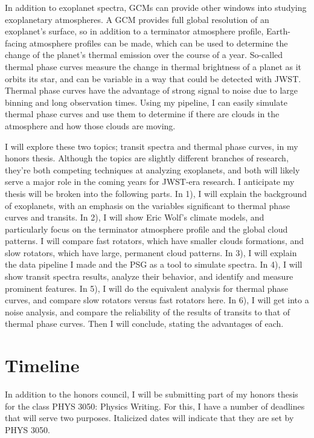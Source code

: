 \documentclass[11pt]{article}
\begin{document}
In addition to exoplanet spectra, GCMs can provide other windows into studying exoplanetary atmospheres. A GCM provides full global resolution of an exoplanet's surface, so in addition to a terminator atmosphere profile, Earth-facing atmosphere profiles can be made, which can be used to determine the change of the planet's thermal emission over the course of a year. So-called thermal phase curves measure the change in thermal brightness of a planet as it orbits its star, and can be variable in a way that could be detected with JWST. Thermal phase curves have the advantage of strong signal to noise due to large binning and long observation times. Using my pipeline, I can easily simulate thermal phase curves and use them to determine if there are clouds in the atmosphere and how those clouds are moving.

I will explore these two topics; transit spectra and thermal phase curves, in my honors thesis. Although the topics are slightly different branches of research, they're both competing techniques at analyzing exoplanets, and both will likely serve a major role in the coming years for JWST-era research. I anticipate my thesis will be broken into the following parts. In 1), I will explain the background of exoplanets, with an emphasis on the variables significant to thermal phase curves and transits. In 2), I will show Eric Wolf's climate models, and particularly focus on the terminator atmosphere profile and the global cloud patterns. I will compare fast rotators, which have smaller clouds formations, and slow rotators, which have large, permanent cloud patterns. In 3), I will explain the data pipeline I made and the PSG as a tool to simulate spectra. In 4), I will show transit spectra results, analyze their behavior, and identify and measure prominent features. In 5), I will do the equivalent analysis for thermal phase curves, and compare slow rotators versus fast rotators here. In 6), I will get into a noise analysis, and compare the reliability of the results of transits to that of thermal phase curves. Then I will conclude, stating the advantages of each.

\section*{Timeline}
In addition to the honors council, I will be submitting part of my honors thesis for the class PHYS 3050: Physics Writing. For this, I have a number of deadlines that will serve two purposes. Italicized dates will indicate that they are set by PHYS 3050.
\end{document}
